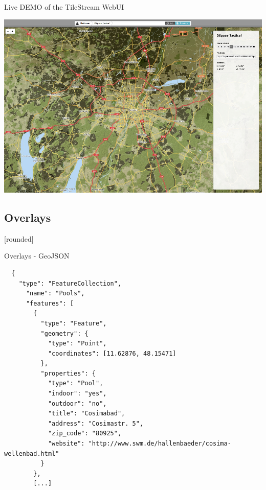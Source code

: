 \documentclass{beamer}
\newcommand\Fontvi{\fontsize{6}{7.2}\selectfont}
\begin{document}
\begin{frame}{Live DEMO of the TileStream WebUI}
 \begin{center}
  \includegraphics[scale=0.3]{images/tilestream_ui}
 \end{center}
\end{frame}

\subsection{Overlays}

[rounded]
\begin{frame}[fragile]{Overlays - GeoJSON}
 \Fontvi
 \begin{block}{}
  \begin{lstlisting}
  {
    "type": "FeatureCollection",
      "name": "Pools",
      "features": [
        {
          "type": "Feature",
          "geometry": {
            "type": "Point",
            "coordinates": [11.62876, 48.15471]
          },
          "properties": {
            "type": "Pool",
            "indoor": "yes",
            "outdoor": "no",
            "title": "Cosimabad",
            "address": "Cosimastr. 5",
            "zip_code": "80925",
            "website": "http://www.swm.de/hallenbaeder/cosima-wellenbad.html"
          }
        },
        [...]
  \end{lstlisting}
 \end{block}
\end{frame}
\end{document}
